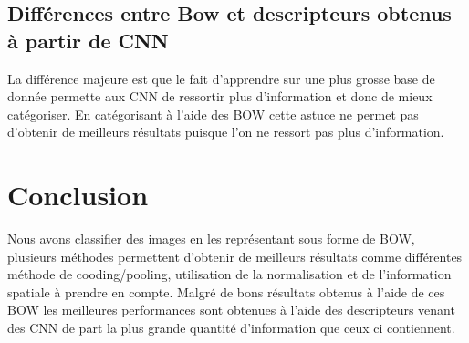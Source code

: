 \documentclass[a4paper]{article}
\begin{document}
\subsection{Différences entre Bow et descripteurs obtenus à partir de CNN}
La différence majeure est que le fait d'apprendre sur une plus grosse base de donnée permette aux CNN de ressortir plus d'information et donc de mieux catégoriser. En catégorisant à l'aide des BOW cette astuce ne permet pas d'obtenir de meilleurs résultats puisque l'on ne ressort pas plus d'information.
\section{Conclusion}
Nous avons classifier des images en les représentant sous forme de BOW, plusieurs méthodes permettent d'obtenir de meilleurs résultats comme différentes méthode de cooding/pooling, utilisation de la normalisation et de l'information spatiale à prendre en compte. Malgré de bons résultats obtenus à l'aide de ces BOW les meilleures performances sont obtenues à l'aide des descripteurs venant des CNN de part la plus grande quantité d'information que ceux ci contiennent.
\end{document}
